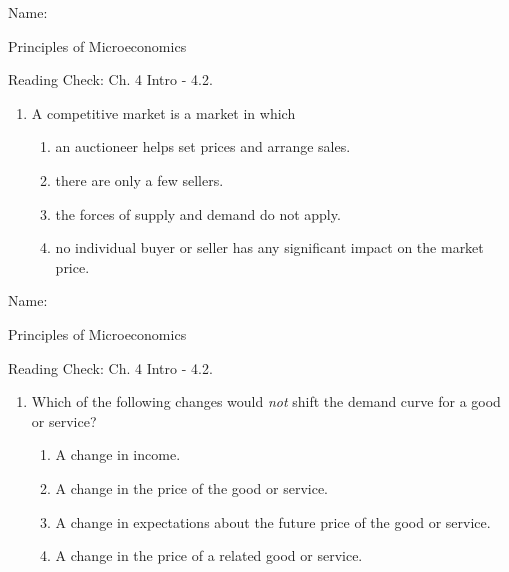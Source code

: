 \documentclass{article}
\begin{document}
Name: \underline{\phantom{xxxxxxxxxxxxxxxxxxxx}}

Principles of Microeconomics

Reading Check: Ch. 4 Intro - 4.2.

\begin{enumerate}

\item A competitive market is a market in which

	\begin{enumerate}
	
	\item an auctioneer helps set prices and arrange sales.
	
	\item there are only a few sellers.
	
	\item the forces of supply and demand do not apply.
	
	\item no individual buyer or seller has any significant impact on the market price.
	
	\end{enumerate}
	
\end{enumerate}

\bigskip

Name: \underline{\phantom{xxxxxxxxxxxxxxxxxxxx}}

Principles of Microeconomics

Reading Check: Ch. 4 Intro - 4.2.

\begin{enumerate}

\item Which of the following changes would \textit{not} shift the demand curve for a good or service?

	\begin{enumerate}
	
	\item A change in income.
	
	\item A change in the price of the good or service.
	
	\item A change in expectations about the future price of the good or service.

	\item A change in the price of a related good or service.
	
	\end{enumerate}
	
\end{enumerate}
\end{document}
